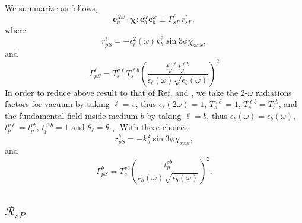 \documentclass[10pt]{article}
\begin{document}
We summarize as follows,
\begin{equation*}
\mathbf{e}^{\,2\omega}_v\cdot
\boldsymbol{\chi}:\mathbf{e}^\omega_{b}\mathbf{e}^\omega_{b}
\equiv\Gamma^{\ell}_{sP}\, r^{\ell}_{sP},
\end{equation*}
where
\begin{equation*}
r^{\ell}_{pS}
= -\epsilon^{2}_{\ell}(\omega)k^{2}_{b}\sin3\phi\chi_{xxx},
\end{equation*} 
and  
\begin{equation*}
\Gamma^{\ell}_{pS} =
T^{v\ell}_{s}T^{\ell b}_{s}\left(\frac{t^{v\ell}_{p}t^{\ell b}_{p}}
      {\epsilon_{\ell}(\omega)\sqrt{\epsilon_{b}(\omega)}}\right)^{2}
\end{equation*} 
In order to reduce above result to that of Ref. \cite{mizrahiJOSA88} and
\cite{sipePRB87},  we take the 2-$\omega$ radiations factors for vacuum by
taking $\ell=v$, thus $\epsilon_{\ell}(2\omega)=1$, $T^{v\ell}_{s}=1$,
$T^{\ell b}_{s}=T^{vb}_{s}$, and the fundamental field inside medium $b$ by
taking $\ell=b$, thus $\epsilon_{\ell}(\omega)=\epsilon_{b}(\omega)$,
$t^{v\ell}_{p}=t^{vb}_{p}$, $t^{\ell b}_{p}=1$ and
$\theta_{\ell}=\theta_{\mathrm{in}}$. With these choices,
\begin{equation*}
r^{b}_{pS} = -k^{2}_{b}\sin3\phi\chi_{xxx},
\end{equation*} 
and 
\begin{equation*}
\Gamma^{b}_{pS} =
T^{vb}_{s}\left(\frac{t^{vb}_{p}}{\epsilon_{b}(\omega)\sqrt{\epsilon_{b}(\omega)}}\right)^{2}.  
\end{equation*} 


\subsection{\texorpdfstring{$\mathcal{R}_{sP}$}{RsP}}
\end{document}
